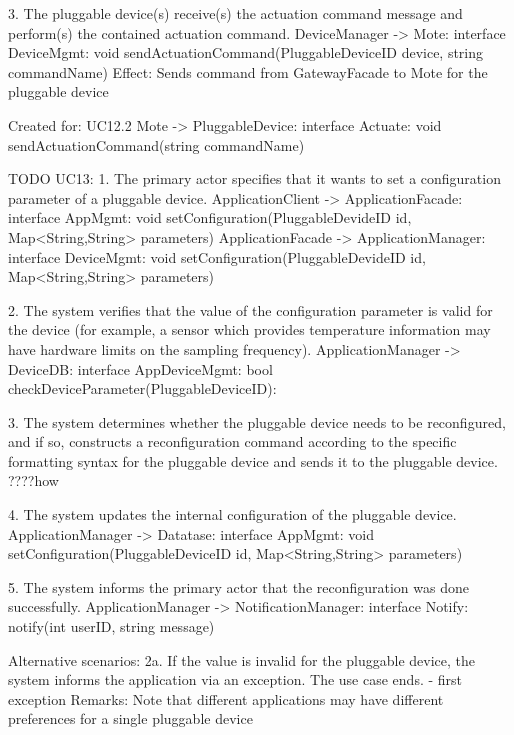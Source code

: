             3. The pluggable device(s) receive(s) the actuation command message and perform(s) the contained actuation command.
                    DeviceManager -> Mote: interface DeviceMgmt: void sendActuationCommand(PluggableDeviceID device, string commandName)
                    Effect: Sends command from GatewayFacade to Mote for the pluggable device
                        \item Created for: UC12.2
                    Mote -> PluggableDevice: interface Actuate:    void sendActuationCommand(string commandName)


        TODO
        UC13:
            1. The primary actor specifies that it wants to set a configuration parameter of a pluggable
            device.
                ApplicationClient -> ApplicationFacade: interface AppMgmt:
                                                        void setConfiguration(PluggableDevideID id, Map<String,String> parameters)
                ApplicationFacade -> ApplicationManager: interface DeviceMgmt:
                                                        void setConfiguration(PluggableDevideID id, Map<String,String> parameters)


            2. The system verifies that the value of the configuration parameter is valid for the device (for
               example, a sensor which provides temperature information may have hardware limits on the
               sampling frequency).
               ApplicationManager -> DeviceDB: interface AppDeviceMgmt: bool checkDeviceParameter(PluggableDeviceID):

            3. The system determines whether the pluggable device needs to be reconfigured, and if so,
               constructs a reconfiguration command according to the specific formatting syntax for the
               pluggable device and sends it to the pluggable device. ????how

            4. The system updates the internal configuration of the pluggable device.
                ApplicationManager -> Datatase: interface AppMgmt:
                                                     void setConfiguration(PluggableDeviceID id, Map<String,String> parameters)

            5. The system informs the primary actor that the reconfiguration was done successfully.
                ApplicationManager -> NotificationManager: interface Notify: notify(int userID, string message)

            Alternative scenarios:
            2a. If the value is invalid for the pluggable device, the system informs the application via an
                exception. The use case ends.
                - first exception
            Remarks:
                Note that different applications may have different preferences for a single pluggable device

